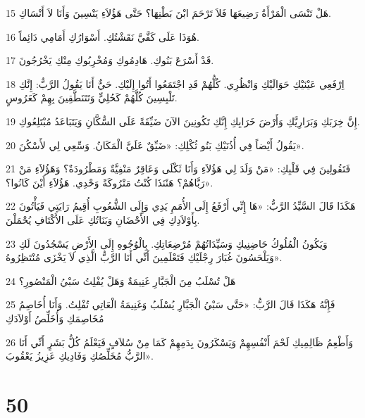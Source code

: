 \par 15 هَلْ تَنْسَى الْمَرْأَةُ رَضِيعَهَا فَلاَ تَرْحَمَ ابْنَ بَطْنِهَا؟ حَتَّى هَؤُلاَءِ يَنْسِينَ وَأَنَا لاَ أَنْسَاكِ.
\par 16 هُوَذَا عَلَى كَفَّيَّ نَقَشْتُكِ. أَسْوَارُكِ أَمَامِي دَائِماً.
\par 17 قَدْ أَسْرَعَ بَنُوكِ. هَادِمُوكِ وَمُخْرِبُوكِ مِنْكِ يَخْرُجُونَ.
\par 18 اِرْفَعِي عَيْنَيْكِ حَوَالَيْكِ وَانْظُرِي. كُلُّهُمْ قَدِ اجْتَمَعُوا أَتُوا إِلَيْكِ. حَيٌّ أَنَا يَقُولُ الرَّبُّ: إِنَّكِ تَلْبِسِينَ كُلَّهُمْ كَحُلِيٍّ وَتَتَنَطَّقِينَ بِهِمْ كَعَرُوسٍ.
\par 19 إِنَّ خِرَبَكِ وَبَرَارِيَّكِ وَأَرْضَ خَرَابِكِ إِنَّكِ تَكُونِينَ الآنَ ضَيِّقَةً عَلَى السُّكَّانِ وَيَتَبَاعَدُ مُبْتَلِعُوكِ.
\par 20 يَقُولُ أَيْضاً فِي أُذُنَيْكِ بَنُو ثُكْلِكِ: «ضَيِّقٌ عَلَيَّ الْمَكَانُ. وَسِّعِي لِي لأَسْكُنَ».
\par 21 فَتَقُولِينَ فِي قَلْبِكِ: «مَنْ وَلَدَ لِي هَؤُلاَءِ وَأَنَا ثَكْلَى وَعَاقِرٌ مَنْفِيَّةٌ وَمَطْرُودَةٌ؟ وَهَؤُلاَءِ مَنْ رَبَّاهُمْ؟ هَئَنَذَا كُنْتُ مَتْرُوكَةً وَحْدِي. هَؤُلاَءِ أَيْنَ كَانُوا؟».
\par 22 هَكَذَا قَالَ السَّيِّدُ الرَّبُّ: «هَا إِنِّي أَرْفَعُ إِلَى الأُمَمِ يَدِي وَإِلَى الشُّعُوبِ أُقِيمُ رَايَتِي فَيَأْتُونَ بِأَوْلاَدِكِ فِي الأَحْضَانِ وَبَنَاتُكِ عَلَى الأَكْتَافِ يُحْمَلْنَ.
\par 23 وَيَكُونُ الْمُلُوكُ حَاضِنِيكِ وَسَيِّدَاتُهُمْ مُرْضِعَاتِكِ. بِالْوُجُوهِ إِلَى الأَرْضِ يَسْجُدُونَ لَكِ وَيَلْحَسُونَ غُبَارَ رِجْلَيْكِ فَتَعْلَمِينَ أَنِّي أَنَا الرَّبُّ الَّذِي لاَ يَخْزَى مُنْتَظِرُوهُ».
\par 24 هَلْ تُسْلَبُ مِنَ الْجَبَّارِ غَنِيمَةٌ وَهَلْ يُفْلِتُ سَبْيُ الْمَنْصُورِ؟
\par 25 فَإِنَّهُ هَكَذَا قَالَ الرَّبُّ: «حَتَّى سَبْيُ الْجَبَّارِ يُسْلَبُ وَغَنِيمَةُ الْعَاتِي تُفْلِتُ. وَأَنَا أُخَاصِمُ مُخَاصِمَكِ وَأُخَلِّصُ أَوْلاَدَكِ
\par 26 وَأَطْعِمُ ظَالِمِيكِ لَحْمَ أَنْفُسِهِمْ وَيَسْكَرُونَ بِدَمِهِمْ كَمَا مِنْ سُلاَفٍ فَيَعْلَمُ كُلُّ بَشَرٍ أَنِّي أَنَا الرَّبُّ مُخَلِّصُكِ وَفَادِيكِ عَزِيزُ يَعْقُوبَ».

\chapter{50}

